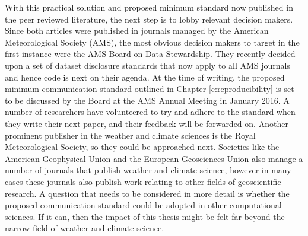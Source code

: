 With this practical solution \citep{IrvingSimmonds2015} and proposed minimum standard \citep{IrvingBAMS2016} now published in the peer reviewed literature, the next step is to lobby relevant decision makers. Since both articles were published in journals managed by the American Meteorological Society (AMS), the most obvious decision makers to target in the first instance were the AMS Board on Data Stewardship. They recently decided upon a set of dataset disclosure standards that now apply to all AMS journals \citep{Mayernik2015} and hence code is next on their agenda. At the time of writing, the proposed minimum communication standard outlined in Chapter \ref{c:reproducibility} is set to be discussed by the Board at the AMS Annual Meeting in January 2016. A number of researchers have volunteered to try and adhere to the standard when they write their next paper, and their feedback will be forwarded on. Another prominent publisher in the weather and climate sciences is the Royal Meteorological Society, so they could be approached next. Societies like the American Geophysical Union and the European Geosciences Union also manage a number of journals that publish weather and climate science, however in many cases these journals also publish work relating to other fields of geoscientific research. A question that needs to be considered in more detail is whether the proposed communication standard could be adopted in other computational sciences. If it can, then the impact of this thesis might be felt far beyond the narrow field of weather and climate science. 

